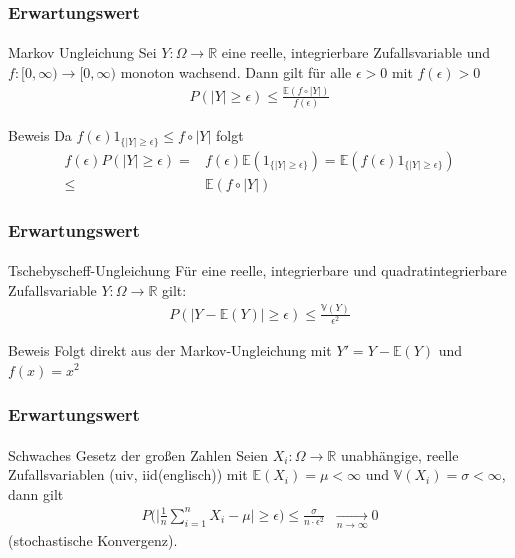 \documentclass{beamer}
\begin{document}
\begin{frame}
    \frametitle{Erwartungswert}
\framesubtitle{}
\begin{block}{Markov Ungleichung}
Sei $Y : \Omega \to \mathbb{R}$  eine  reelle, integrierbare  Zufallsvariable und $f : [0, \infty) \to [0, \infty)$ monoton wachsend.
Dann gilt für alle $\epsilon > 0$ mit $f(\epsilon) > 0$
\begin{align*}
P (|Y |  \geq \epsilon) \leq \frac{\mathbb{E} (f \circ |Y|)}{f(\epsilon)}
\end{align*}
\end{block}
\begin{block}{Beweis}
Da $f(\epsilon) 1_{\{ |Y| \geq  \epsilon \} } \leq f \circ |Y|$ folgt
\begin{align*}
f(\epsilon) P(|Y| \geq \epsilon) = & f(\epsilon) \mathbb{E}(1_{\{ |Y| \geq  \epsilon \} }) = \mathbb{E}( f(\epsilon) 1_{\{ |Y| \geq  \epsilon \} }) \\
\leq & \mathbb{E}( f \circ |Y|)
\end{align*}
\end{block}
 \end{frame}






\begin{frame}
    \frametitle{Erwartungswert}
\framesubtitle{}
\begin{block}{Tschebyscheff-Ungleichung}
Für eine reelle, integrierbare und quadratintegrierbare  Zufallsvariable $Y : \Omega \to \mathbb{R}$  gilt:
\begin{align*}
P (|Y  - \mathbb{E} (Y)|  \geq \epsilon) \leq \frac{\mathbb{V} (Y)}{ \epsilon^2} 
\end{align*}
\end{block}
\begin{block}{Beweis}
Folgt direkt aus der Markov-Ungleichung mit $Y' = Y -\mathbb{E}(Y)$ und $f(x) = x^2$
\end{block}
 \end{frame}



\begin{frame}
    \frametitle{Erwartungswert}
\framesubtitle{}
\begin{block}{Schwaches Gesetz der großen Zahlen}
Seien $X_i : \Omega \to \mathbb{R}$ unabhängige, reelle Zufallsvariablen (uiv, iid(englisch)) mit $\mathbb{E}(X_i) = \mu < \infty$ und $\mathbb{V}(X_i) = \sigma < \infty$, dann gilt
\begin{align*}
P \bigl  ( \bigl | \frac{1}{n} \sum_{i=1}^{n} X_i - \mu \bigr |  \geq \epsilon \bigr) \leq \frac{\sigma}{ n \cdot \epsilon^2} \; \; \underset{n \to \infty}{\longrightarrow} 0
\end{align*}
(stochastische Konvergenz). 
\end{block}
 \end{frame}
\end{document}
